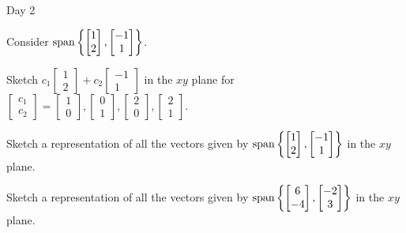 \begin{applicationActivities}{Day 2}
\begin{activity}{10}
  Consider \(\operatorname{span}\left\{\begin{bmatrix}1\\2\end{bmatrix},
  \begin{bmatrix}-1\\1\end{bmatrix}\right\}\).
  \begin{subactivity}
    Sketch
    \(c_1\begin{bmatrix}1\\2\end{bmatrix}+
    c_2\begin{bmatrix}-1\\1\end{bmatrix}\) in the \(xy\) plane
    for \(\begin{bmatrix}c_1\\c_2\end{bmatrix}=
    \begin{bmatrix}1\\0\end{bmatrix},
    \begin{bmatrix}0\\1\end{bmatrix},
    \begin{bmatrix}2\\0\end{bmatrix},
    \begin{bmatrix}2\\1\end{bmatrix}\).
  \end{subactivity}
  \begin{subactivity}
    Sketch a representation of all the vectors given by
    \(\operatorname{span}\left\{\begin{bmatrix}1\\2\end{bmatrix},
     \begin{bmatrix}-1\\1\end{bmatrix}\right\}\)
    in the \(xy\) plane.
  \end{subactivity}
\end{activity}

\begin{activity}{5}
    Sketch a representation of all the vectors given by
    \(\operatorname{span}\left\{\begin{bmatrix}6\\-4\end{bmatrix},
     \begin{bmatrix}-2\\3\end{bmatrix}\right\}\)
    in the \(xy\) plane.
\end{activity}


\end{applicationActivities}
